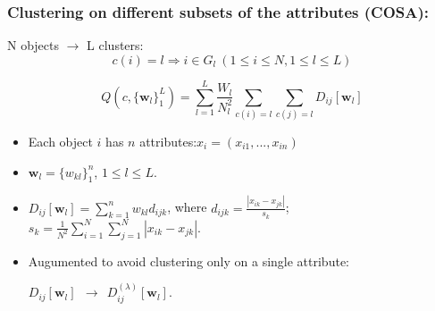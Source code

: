 \documentclass{beamer}
\begin{document}
\begin{frame}
\frametitle{Clustering on different subsets of the attributes (COSA):}
N objects $\to$ L clusters:
\[
c(i)=l \Rightarrow i \in G_l~(1\leq i \leq N, 1 \leq l \leq L)
\]

\[
Q(c,\{\textbf{w}_l\}^{L}_1)=\sum^{L}_{l=1}\frac{W_l}{N^2_l}\sum_{c(i)=l}\sum_{c(j)=l}D_{ij}[\textbf{w}_l]
\]
\begin{itemize}
\item Each object $i$ has $n$ attributes:$x_i=(x_{i1},...,x_{in})$
\item $\textbf{w}_l=\{w_{kl}\}^n_1$, $1 \leq l \leq L$.
\item $D_{ij}[\textbf{w}_l]=\sum^n_{k=1}w_{kl}d_{ijk}$,
where $d_{ijk}=\frac{|x_{ik}-x_{jk}|}{s_k}$; $s_k=\frac{1}{N^2}\sum^N_{i=1}\sum^N_{j=1}|x_{ik}-x_{jk}|$.
\item Augumented to avoid clustering only on a single attribute:

$D_{ij}[\textbf{w}_l]~~\rightarrow~~D^{(\lambda)}_{ij}[\textbf{w}_l]$.
\end{itemize}
\end{frame}
\end{document}
